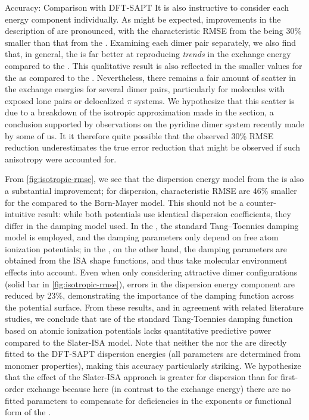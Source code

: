 \begin{subsection}{Accuracy: Comparison with DFT-SAPT}
It is also instructive to consider each energy component individually.  As
might be expected, improvements in the description of \erep are pronounced,
with the characteristic RMSE from the \isaffold being 30\% smaller than that from the \saptff.
Examining each dimer pair separately, 
we also find that, in general, the \isaffold
is far better at reproducing \emph{trends} in the exchange energy compared to
the \saptff. This qualitative result is also reflected in the smaller \mse
values for the \isaffold as compared to the \saptff.
Nevertheless, there remains a fair amount of scatter in the exchange
energies for several dimer pairs, particularly for molecules with exposed lone
pairs or delocalized $\pi$ systems. We hypothesize that this scatter is due to
a breakdown of the isotropic approximation made in the 
section, a conclusion supported by observations on the pyridine dimer system
recently made by some of us.\cite{Misquitta2015b}
It it therefore quite possible that the observed 30\% RMSE reduction 
underestimates the true error reduction that might be observed
if such anisotropy were accounted for.

From  \cref{fig:isotropic-rmse}, we see that the dispersion energy model from the 
\isaffold is also a substantial improvement; for dispersion, characteristic RMSE
are 46\% smaller for the \isaffold compared to the Born-Mayer model.
This should not be a counter-intuitive result: while both potentials use identical
dispersion coefficients, they differ in the damping model used.
In the \saptff, the standard Tang--Toennies damping model is employed, and 
the damping parameters only depend on free atom ionization potentials; 
in the \isaffold, on the other hand, the damping parameters are obtained from the
ISA shape functions, and thus take 
molecular environment effects into account.
Even when only considering attractive dimer configurations (solid bar in
\cref{fig:isotropic-rmse}), errors in the dispersion energy component are reduced by 23\%,
demonstrating the importance of the damping function across the potential surface. 
From these results, and in agreement with related literature
studies,\cite{Sebetci2010} we conclude that use of
the standard Tang-Toennies damping function based on atomic ionization
potentials
\cite{Tang1984, Misquitta2008a, Price2010, Totton2010a, McDaniel2013, Hermida-Ramon2000, Nyeland1990} 
lacks quantitative predictive power compared to the Slater-ISA model.
Note that neither the \isaffold nor the \saptff are directly fitted to the DFT-SAPT
dispersion energies (all parameters are determined from monomer properties),
making this accuracy particularly striking.  We hypothesize that the effect of
the Slater-ISA approach is greater for dispersion than for first-order exchange
because here (in contrast to the exchange energy) there are no fitted
parameters to compensate for deficiencies in the exponents or functional form
of the \saptff.


\end{subsection}
